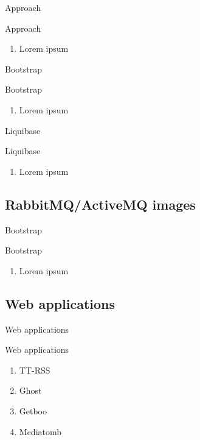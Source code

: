 \documentclass{beamer}
\begin{document}
\begin{frame}{Approach}
  \begin{block}{Approach}
    \begin{enumerate}
    \item Lorem ipsum
    \end{enumerate}
  \end{block}
\end{frame}

\begin{frame}{Bootstrap}
  \begin{block}{Bootstrap}
    \begin{enumerate}
    \item Lorem ipsum
    \end{enumerate}
  \end{block}
\end{frame}

\begin{frame}{Liquibase}
  \begin{block}{Liquibase}
    \begin{enumerate}
    \item Lorem ipsum
    \end{enumerate}
  \end{block}
\end{frame}

\subsection{RabbitMQ/ActiveMQ images}

\begin{frame}{Bootstrap}
  \begin{block}{Bootstrap}
    \begin{enumerate}
    \item Lorem ipsum
    \end{enumerate}
  \end{block}
\end{frame}

\subsection{Web applications}

\begin{frame}{Web applications}
  \begin{block}{Web applications}
    \begin{enumerate}
    \item TT-RSS
    \item Ghost
    \item Getboo
    \item Mediatomb
    \end{enumerate}
  \end{block}
\end{frame}
\end{document}
